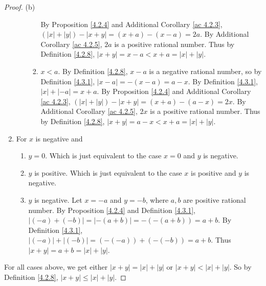 \begin{proof}{(b)}
\begin{enumerate}[label=(\Roman*)]
\begin{enumerate}[label=(\roman*)]
\begin{enumerate}[label=(\arabic*)]
            By Proposition \ref{4.2.4} and Additional Corollary \ref{ac 4.2.3}, \((|x| + |y|) - |x + y| = (x + a) - (x - a) = 2a\).
            By Additional Corollary \ref{ac 4.2.5}, \(2a\) is a positive rational number.
            Thus by Definition \ref{4.2.8}, \(|x + y| = x - a < x + a = |x| + |y|\).
            \item \(x < a\).
            By Definition \ref{4.2.8}, \(x - a\) is a negative rational number, so by Definition \ref{4.3.1}, \(|x - a| = -(x - a) = a - x\).
            By Definition \ref{4.3.1}, \(|x| + |-a| = x + a\).
            By Proposition \ref{4.2.4} and Additional Corollary \ref{ac 4.2.3}, \((|x| + |y|) - |x + y| = (x + a) - (a - x) = 2x\).
            By Additional Corollary \ref{ac 4.2.5}, \(2x\) is a positive rational number.
            Thus by Definition \ref{4.2.8}, \(|x + y| = a - x < x + a = |x| + |y|\).
        \end{enumerate}
    \end{enumerate}
    \item For \(x\) is negative and
    \begin{enumerate}[label=(\roman*)]
        \item \(y = 0\).
        Which is just equivalent to the case \(x = 0\) and \(y\) is negative.
        \item \(y\) is positive.
        Which is just equivalent to the case \(x\) is positive and \(y\) is negative.
        \item \(y\) is negative.
        Let \(x = -a\) and \(y = -b\), where \(a, b\) are positive rational number.
        By Proposition \ref{4.2.4} and Definition \ref{4.3.1}, \(|(-a) + (-b)| = |-(a + b)| = -(-(a + b)) = a + b\).
        By Definition \ref{4.3.1}, \(|(-a)| + |(-b)| = (-(-a)) + (-(-b)) = a + b\).
        Thus \(|x + y| = a + b = |x| + |y|\).
    \end{enumerate}
\end{enumerate}
For all cases above, we get either \(|x + y| = |x| + |y|\) or \(|x + y| < |x| + |y|\).
So by Definition \ref{4.2.8}, \(|x + y| \leq |x| + |y|\).
\end{proof}

